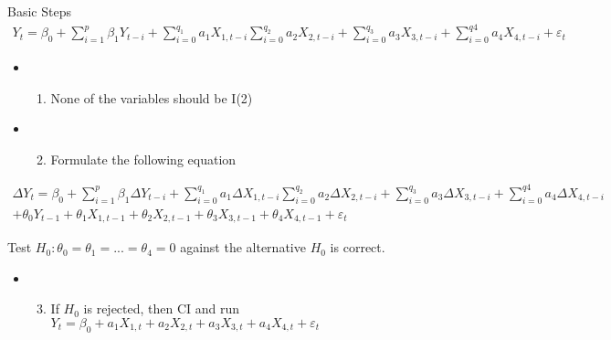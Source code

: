 \documentclass[
  ignorenonframetext,
  aspectratio=169]{beamer}
\providecommand{\tightlist}{%
  \setlength{\itemsep}{0pt}\setlength{\parskip}{0pt}}
\begin{document}
\begin{frame}{Basic Steps}
\protect\hypertarget{basic-steps}{}
\[\begin{aligned}{{Y}_{t}}={{\beta}_{0}}+\sum\limits_{i=1}^{p}{{{\beta}_{1}}{{Y}_{t-i}}+\sum\limits_{i=0}^{{{q}_{1}}}{{{a}_{1}}{{X}_{1,t-i}}\sum\limits_{i=0}^{{{q}_{2}}}{{{a}_{2}}{{X}_{2,t-i}}+}}}\sum\limits_{i=0}^{{{q}_{3}}}{{{a}_{3}}{{X}_{3,t-i}}+}\sum\limits_{i=0}^{q4}{{{a}_{4}}{{X}_{4,t-i}}+}{{\varepsilon}_{t}}\end{aligned}\]

\begin{itemize}
\item
  \begin{enumerate}
  \tightlist
  \item
    None of the variables should be I(2)
  \end{enumerate}
\item
  \begin{enumerate}
  \setcounter{enumi}{1}
  \tightlist
  \item
    Formulate the following equation
  \end{enumerate}
\end{itemize}

\[\begin{aligned}\Delta {{Y}_{t}}={{\beta}_{0}}+\sum\limits_{i=1}^{p}{{{\beta }_{1}}\Delta{{Y}_{t-i}}+\sum\limits_{i=0}^{{{q}_{1}}}{{{a}_{1}}\Delta{{X}_{1,t-i}}\sum\limits_{i=0}^{{{q}_{2}}}{{{a}_{2}}\Delta{{X}_{2,t-i}}+}}}\sum\limits_{i=0}^{{{q}_{3}}}{{{a}_{3}}\Delta{{X}_{3,t-i}}+}\sum\limits_{i=0}^{q4}{{{a}_{4}}\Delta{{X}_{4,t-i}}}\\+{{\theta}_{0}}{{Y}_{t-1}}+{{\theta}_{1}}{{X}_{1,t-1}}+{{\theta}_{2}}{{X}_{2,t-1}}+{{\theta}_{3}}{{X}_{3,t-1}}+{{\theta}_{4}}{{X}_{4,t-1}}+{{\varepsilon}_{t}}\end{aligned}\]

Test \({{H}_{0}}:{{\theta}_{0}}={{\theta }_{1}}=...={{\theta }_{4}}=0\)
against the alternative \(H_0\) is correct.

\begin{itemize}
\item
  \begin{enumerate}
  \setcounter{enumi}{2}
  \tightlist
  \item
    If \(H_0\) is rejected, then CI and run
    \({{Y}_{t}}={{\beta}_{0}}+{{a}_{1}}{{X}_{1,t}}+{{a}_{2}}{{X}_{2,t}}+{{a}_{3}}{{X}_{3,t}}+{{a}_{4}}{{X}_{4,t}}+{{\varepsilon}_{t}}\)
  \end{enumerate}
\end{itemize}
\end{frame}
\end{document}
